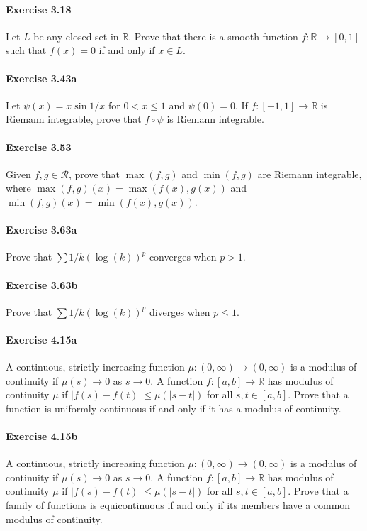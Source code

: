 \documentclass{article}
\begin{document}
\paragraph{Exercise 3.18} Let $L$ be any closed set in $\mathbb{R}$. Prove that there is a smooth function $f \colon \mathbb{R} \rightarrow [0, 1]$ such that $f(x) = 0$ if and only if $x \in L$.

\paragraph{Exercise 3.43a} Let $\psi(x) = x \sin 1/x$ for $0 < x \leq 1$ and $\psi(0) = 0$.  If $f \colon [-1, 1] \rightarrow \mathbb{R}$ is Riemann integrable, prove that $f \circ \psi$ is Riemann integrable.

\paragraph{Exercise 3.53} Given $f, g \in \mathcal{R}$, prove that $\max(f, g)$ and $\min(f, g)$ are Riemann integrable, where $\max(f, g)(x) = \max(f(x), g(x))$ and $\min(f, g)(x) = \min(f(x), g(x))$.

\paragraph{Exercise 3.63a} Prove that $\sum 1/k(\log(k))^p$ converges when $p > 1$.

\paragraph{Exercise 3.63b} Prove that $\sum 1/k(\log(k))^p$ diverges when $p \leq 1$.

\paragraph{Exercise 4.15a} A continuous, strictly increasing function $\mu \colon (0, \infty) \rightarrow (0, \infty)$ is a modulus of continuity if $\mu(s) \rightarrow 0$ as $s \rightarrow 0$. A function $f \colon [a, b] \rightarrow \mathbb{R}$ has modulus of continuity $\mu$ if $|f(s) - f(t)| \leq \mu(|s - t|)$ for all $s, t \in [a, b]$. Prove that a function is uniformly continuous if and only if it has a modulus of continuity.

\paragraph{Exercise 4.15b} A continuous, strictly increasing function $\mu \colon (0, \infty) \rightarrow (0, \infty)$ is a modulus of continuity if $\mu(s) \rightarrow 0$ as $s \rightarrow 0$. A function $f \colon [a, b] \rightarrow \mathbb{R}$ has modulus of continuity $\mu$ if $|f(s) - f(t)| \leq \mu(|s - t|)$ for all $s, t \in [a, b]$. Prove that a family of functions is equicontinuous if and only if its members have a common modulus of continuity.
\end{document}
